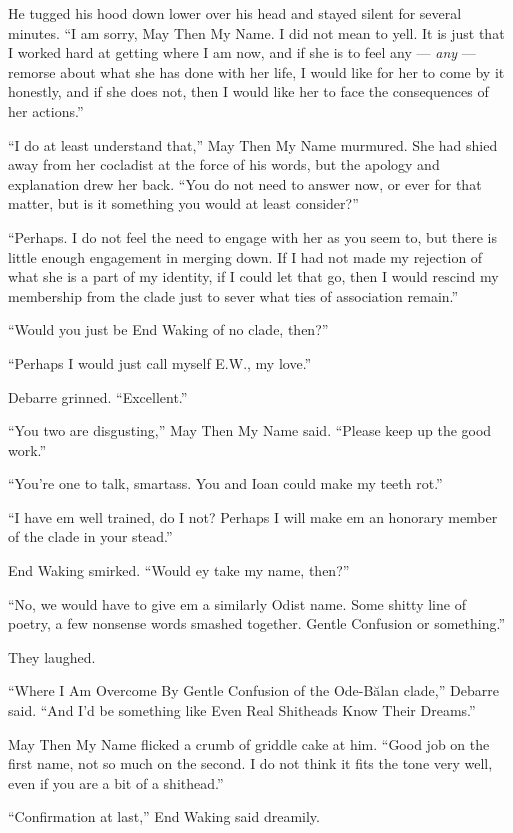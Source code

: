He tugged his hood down lower over his head and stayed silent for several minutes. ``I am sorry, May Then My Name. I did not mean to yell. It is just that I worked hard at getting where I am now, and if she is to feel any — \emph{any} — remorse about what she has done with her life, I would like for her to come by it honestly, and if she does not, then I would like her to face the consequences of her actions.''

``I do at least understand that,'' May Then My Name murmured. She had shied away from her cocladist at the force of his words, but the apology and explanation drew her back. ``You do not need to answer now, or ever for that matter, but is it something you would at least consider?''

``Perhaps. I do not feel the need to engage with her as you seem to, but there is little enough engagement in merging down. If I had not made my rejection of what she is a part of my identity, if I could let that go, then I would rescind my membership from the clade just to sever what ties of association remain.''

``Would you just be End Waking of no clade, then?''

``Perhaps I would just call myself E.W., my love.''

Debarre grinned. ``Excellent.''

``You two are disgusting,'' May Then My Name said. ``Please keep up the good work.''

``You're one to talk, smartass. You and Ioan could make my teeth rot.''

``I have em well trained, do I not? Perhaps I will make em an honorary member of the clade in your stead.''

End Waking smirked. ``Would ey take my name, then?''

``No, we would have to give em a similarly Odist name. Some shitty line of poetry, a few nonsense words smashed together. Gentle Confusion or something.''

They laughed.

``Where I Am Overcome By Gentle Confusion of the Ode-Bălan clade,'' Debarre said. ``And I'd be something like Even Real Shitheads Know Their Dreams.''

May Then My Name flicked a crumb of griddle cake at him. ``Good job on the first name, not so much on the second. I do not think it fits the tone very well, even if you are a bit of a shithead.''

``Confirmation at last,'' End Waking said dreamily.

